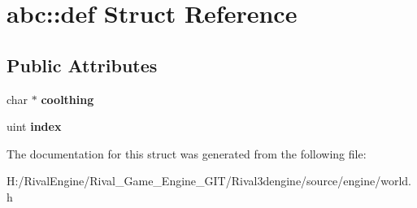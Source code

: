 \hypertarget{structabc_1_1def}{}\section{abc\+:\+:def Struct Reference}
\label{structabc_1_1def}
\subsection*{Public Attributes}
\begin{DoxyCompactItemize}
\item 
\mbox{\label{structabc_1_1def_af7d08b31440cd001d29aa8f10515755c}} 
char $\ast$ {\bfseries coolthing}
\item 
\mbox{\label{structabc_1_1def_a6c1105a3e97805c51925b5aa85665808}} 
uint {\bfseries index}
\end{DoxyCompactItemize}


The documentation for this struct was generated from the following file\+:\begin{DoxyCompactItemize}
\item 
H\+:/\+Rival\+Engine/\+Rival\+\_\+\+Game\+\_\+\+Engine\+\_\+\+G\+I\+T/\+Rival3dengine/source/engine/world.\+h\end{DoxyCompactItemize}
